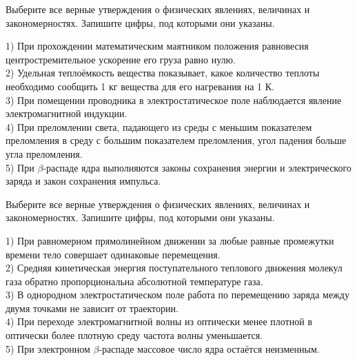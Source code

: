 \begin{taskbasic}[code={\label{task:kim18_img18}}]
Выберите все верные утверждения о физических явлениях, величинах и закономерностях. Запишите цифры, под которыми они указаны.

1) При прохождении математическим маятником положения равновесия центростремительное ускорение его груза равно нулю.\\
2) Удельная теплоёмкость вещества показывает, какое количество теплоты необходимо сообщить 1 кг вещества для его нагревания на 1 К.\\
3) При помещении проводника в электростатическое поле наблюдается явление электромагнитной индукции.\\
4) При преломлении света, падающего из среды с меньшим показателем преломления в среду с большим показателем преломления, угол падения больше угла преломления.\\
5) При $\beta$-распаде ядра выполняются законы сохранения энергии и электрического заряда и закон сохранения импульса.

\end{taskbasic}

\begin{taskbasic}[code={\label{task:kim18_img19}}]
Выберите все верные утверждения о физических явлениях, величинах и закономерностях. Запишите цифры, под которыми они указаны.

1) При равномерном прямолинейном движении за любые равные промежутки времени тело совершает одинаковые перемещения.\\
2) Средняя кинетическая энергия поступательного теплового движения молекул газа обратно пропорциональна абсолютной температуре газа.\\
3) В однородном электростатическом поле работа по перемещению заряда между двумя точками не зависит от траектории.\\
4) При переходе электромагнитной волны из оптически менее плотной в оптически более плотную среду частота волны уменьшается.\\
5) При электронном $\beta$-распаде массовое число ядра остаётся неизменным.

\end{taskbasic}

